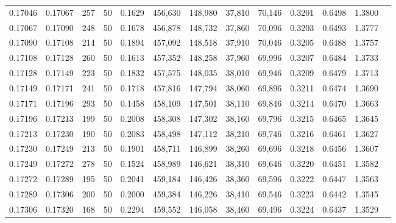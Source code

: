 \begin{tabular}{rrrrrrrrrrrrr}
0.17046 & 0.17067 &   257 &  50 &                                     0.1629 & 456,630 & 148,980 &  37,810 &  70,146 & 0.3201 & 0.6498 & 1.3800 \\
0.17067 & 0.17090 &   248 &  50 &                                     0.1678 & 456,878 & 148,732 &  37,860 &  70,096 & 0.3203 & 0.6493 & 1.3777 \\
0.17090 & 0.17108 &   214 &  50 &                                     0.1894 & 457,092 & 148,518 &  37,910 &  70,046 & 0.3205 & 0.6488 & 1.3757 \\
0.17108 & 0.17128 &   260 &  50 &                                     0.1613 & 457,352 & 148,258 &  37,960 &  69,996 & 0.3207 & 0.6484 & 1.3733 \\
0.17128 & 0.17149 &   223 &  50 &                                     0.1832 & 457,575 & 148,035 &  38,010 &  69,946 & 0.3209 & 0.6479 & 1.3713 \\
0.17149 & 0.17171 &   241 &  50 &                                     0.1718 & 457,816 & 147,794 &  38,060 &  69,896 & 0.3211 & 0.6474 & 1.3690 \\
0.17171 & 0.17196 &   293 &  50 &                                     0.1458 & 458,109 & 147,501 &  38,110 &  69,846 & 0.3214 & 0.6470 & 1.3663 \\
0.17196 & 0.17213 &   199 &  50 &                                     0.2008 & 458,308 & 147,302 &  38,160 &  69,796 & 0.3215 & 0.6465 & 1.3645 \\
0.17213 & 0.17230 &   190 &  50 &                                     0.2083 & 458,498 & 147,112 &  38,210 &  69,746 & 0.3216 & 0.6461 & 1.3627 \\
0.17230 & 0.17249 &   213 &  50 &                                     0.1901 & 458,711 & 146,899 &  38,260 &  69,696 & 0.3218 & 0.6456 & 1.3607 \\
0.17249 & 0.17272 &   278 &  50 &                                     0.1524 & 458,989 & 146,621 &  38,310 &  69,646 & 0.3220 & 0.6451 & 1.3582 \\
0.17272 & 0.17289 &   195 &  50 &                                     0.2041 & 459,184 & 146,426 &  38,360 &  69,596 & 0.3222 & 0.6447 & 1.3563 \\
0.17289 & 0.17306 &   200 &  50 &                                     0.2000 & 459,384 & 146,226 &  38,410 &  69,546 & 0.3223 & 0.6442 & 1.3545 \\
0.17306 & 0.17320 &   168 &  50 &                                     0.2294 & 459,552 & 146,058 &  38,460 &  69,496 & 0.3224 & 0.6437 & 1.3529 \\

\end{tabular}
